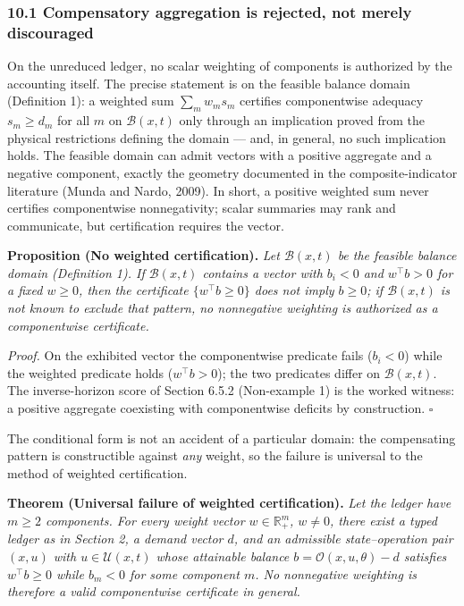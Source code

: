 \documentclass[11pt]{article}
\begin{document}
\subsubsection{10.1 Compensatory aggregation is rejected, not merely
discouraged}\label{compensatory-aggregation-is-rejected-not-merely-discouraged}

On the unreduced ledger, no scalar weighting of components is authorized
by the accounting itself. The precise statement is on the feasible
balance domain (Definition 1): a weighted sum \(\sum_m w_m s_m\)
certifies componentwise adequacy \(s_m \ge d_m\) for all \(m\) on
\(\mathcal{B}(x,t)\) only through an implication proved from the
physical restrictions defining the domain --- and, in general, no such
implication holds. The feasible domain can admit vectors with a positive
aggregate and a negative component, exactly the geometry documented in
the composite-indicator literature (Munda and Nardo, 2009). In short, a
positive weighted sum never certifies componentwise nonnegativity;
scalar summaries may rank and communicate, but certification requires
the vector.

\textbf{Proposition (No weighted certification).} \emph{Let
\(\mathcal{B}(x,t)\) be the feasible balance domain (Definition 1). If
\(\mathcal{B}(x,t)\) contains a vector with \(b_i < 0\) and
\(w^\top b > 0\) for a fixed \(w \ge 0\), then the certificate
\(\{w^\top b \ge 0\}\) does not imply \(b \ge 0\); if
\(\mathcal{B}(x,t)\) is not known to exclude that pattern, no
nonnegative weighting is authorized as a componentwise certificate.}

\emph{Proof.} On the exhibited vector the componentwise predicate fails
(\(b_i < 0\)) while the weighted predicate holds (\(w^\top b > 0\)); the
two predicates differ on \(\mathcal{B}(x,t)\). The inverse-horizon score
of Section 6.5.2 (Non-example 1) is the worked witness: a positive
aggregate coexisting with componentwise deficits by construction. \ensuremath{\square}

The conditional form is not an accident of a particular domain: the
compensating pattern is constructible against \emph{any} weight, so the
failure is universal to the method of weighted certification.

\textbf{Theorem (Universal failure of weighted certification).}
\emph{Let the ledger have \(m \ge 2\) components. For every weight
vector \(w \in \mathbb{R}_+^m\), \(w \neq 0\), there exist a typed
ledger as in Section 2, a demand vector \(d\), and an admissible
state--operation pair \((x, u)\) with \(u \in \mathcal{U}(x,t)\) whose
attainable balance \(b = \mathcal{O}(x,u,\theta) - d\) satisfies
\(w^\top b \ge 0\) while \(b_m < 0\) for some component \(m\). No
nonnegative weighting is therefore a valid componentwise certificate in
general.}
\end{document}
